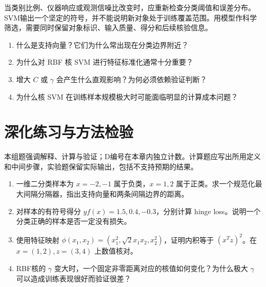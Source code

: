 当类别比例、仪器响应或观测信噪比改变时，应重新检查分类阈值和误差分布。SVM输出一个坚定的符号，并不能说明新对象处于训练覆盖范围。用模型作科学筛选，需要同时保留对象标识、输入质量、得分和后续核验信息。

\chapterexercise
\begin{enumerate}
\item 什么是支持向量？它们为什么常出现在分类边界附近？
\item 为什么对 RBF 核 SVM 进行特征标准化通常十分重要？
\item 增大 $C$ 或 $\gamma$ 会产生什么直观影响？为何必须依赖验证判断？
\item 为什么核 SVM 在训练样本规模极大时可能面临明显的计算成本问题？
\end{enumerate}

\section*{深化练习与方法检验}
本组题强调解释、计算与验证；D编号在本章内独立计数。计算题应写出所用定义和中间步骤，实验题保留实际输出，包括不支持预期的结果。
\begin{enumerate}[label=D\arabic*.]
\item 一维二分类样本为 $x=-2,-1$ 属于负类，$x=1,2$ 属于正类。求一个规范化最大间隔分隔器，指出支持向量和两条间隔边界的距离。
\item 对样本的有符号得分 $yf(x)=1.5,0.4,-0.3$，分别计算 hinge loss。说明一个分类正确的样本是否一定没有损失。
\item 使用特征映射 $\phi(x_1,x_2)=(x_1^2,\sqrt2x_1x_2,x_2^2)$，证明内积等于 $(x^Tz)^2$。在 $x=(1,2),z=(3,4)$ 上数值核对。
\item RBF核的 $\gamma$ 变大时，一个固定非零距离对应的核值如何变化？为什么极大 $\gamma$ 可以造成训练表现很好而验证很差？
\end{enumerate}
